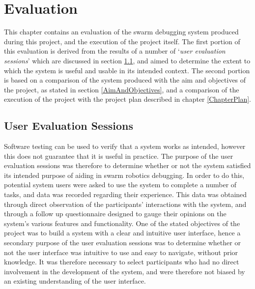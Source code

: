 
\chapter[Evaluation]{Evaluation} %

\label{ChapterEvaluation} %

This chapter contains an evaluation of the swarm debugging system produced during this project, and the execution of the project itself. The first portion of this evaluation is derived from the results of a number of `\textit{user evaluation sessions}' which are discussed in section \ref{UserEvaluationSessions}, and aimed to determine the extent to which the system is useful and usable in its intended context. The second portion is based on a comparison of the system produced with the aim and objectives of the project, as stated in section \ref{AimAndObjectives}, and a comparison of the execution of the project with the project plan described in chapter \ref{ChapterPlan}.


\section{User Evaluation Sessions} \label{UserEvaluationSessions}

Software testing can be used to verify that a system works as intended, however this does not guarantee that it is useful in practice. The purpose of the user evaluation sessions was therefore to determine whether or not the system satisfied its intended purpose of aiding in swarm robotics debugging. In order to do this, potential system users were asked to use the system to complete a number of tasks, and data was recorded regarding their experience. This data was obtained through direct observation of the participants' interactions with the system, and through a follow up questionnaire designed to gauge their opinions on the system's various features and functionality. One of the stated objectives of the project was to build a system with a clear and intuitive user interface, hence a secondary purpose of the user evaluation sessions was to determine whether or not the user interface was intuitive to use and easy to navigate, without prior knowledge. It was therefore necessary to select participants who had no direct involvement in the development of the system, and were therefore not biased by an existing understanding of the user interface.

